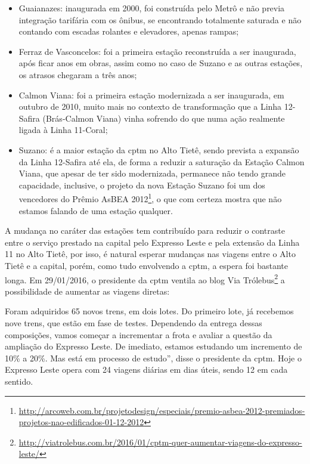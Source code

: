 \documentclass[11pt,fleqn]{book} %
\begin{document}
\begin{itemize}
	\item Guaianazes: inaugurada em 2000, foi construída pelo Metrô e não previa integração tarifária com os ônibus, se encontrando totalmente saturada e não contando com escadas rolantes e elevadores, apenas rampas;
	\item Ferraz de Vasconcelos: foi a primeira estação reconstruída a ser inaugurada, após ficar anos em obras, assim como no caso de Suzano e as outras estações, os atrasos chegaram a três anos;
	\item Calmon Viana: foi a primeira estação modernizada a ser inaugurada, em outubro de 2010, muito mais no contexto de transformação que a Linha 12-Safira (Brás-Calmon Viana) vinha sofrendo do que numa ação realmente ligada à Linha 11-Coral;
	\item Suzano: é a maior estação da \gls{cptm} no Alto Tietê, sendo prevista a expansão da Linha 12-Safira até ela, de forma a reduzir a saturação da Estação Calmon Viana, que apesar de ter sido modernizada, permanece não tendo grande capacidade, inclusive, o projeto da nova Estação Suzano foi um dos vencedores do Prêmio AsBEA 2012\footnote{\url{http://arcoweb.com.br/projetodesign/especiais/premio-asbea-2012-premiados-projetos-nao-edificados-01-12-2012}}, o que com certeza mostra que não estamos falando de uma estação qualquer.
\end{itemize}

A mudança no caráter das estações tem contribuído para reduzir o contraste entre o serviço prestado na capital pelo Expresso Leste e pela extensão da Linha 11 no Alto Tietê, por isso, é natural esperar mudanças nas viagens entre o Alto Tietê e a capital, porém, como tudo envolvendo a \gls{cptm}, a espera foi bastante longa. Em 29/01/2016, o presidente da \gls{cptm} ventila ao blog Via Trólebus\footnote{\url{http://viatrolebus.com.br/2016/01/cptm-quer-aumentar-viagens-do-expresso-leste/}} a possibilidade de aumentar as viagens diretas:

\begin{citacao}
	Foram adquiridos 65 novos trens, em dois lotes. Do primeiro lote, já recebemos nove trens, que estão em fase de testes. Dependendo da entrega dessas composições, vamos começar a incrementar a frota e avaliar a questão da ampliação do Expresso Leste. De imediato, estamos estudando um incremento de 10\% a 20\%. Mas está em processo de estudo”, disse o presidente da \gls{cptm}. Hoje o Expresso Leste opera com 24 viagens diárias em dias úteis, sendo 12 em cada sentido.	
\end{citacao}
\end{document}
